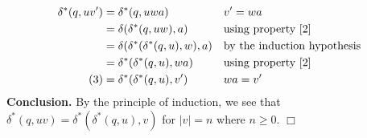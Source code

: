 \documentclass [10pt]{article}
\begin{document}
\begin{enumerate}
\begin{align}
	\delta^{*}(q,uv') &= \delta^{*}(q,uwa) && \text{$v' = wa$} \nonumber \\
	&= \delta(\delta^{*}(q,uw),a) && \text{using property \ref{2}} \nonumber \\
	&= \delta(\delta^{*}(\delta^{*}(q,u),w),a) && \text{by the induction hypothesis} \nonumber \\
	&= \delta^{*}(\delta^{*}(q,u),wa) && \text{using property \ref{2}} \nonumber \\
	\label{3} \tag{3} &= \delta^{*}(\delta^{*}(q,u),v') && \text{$wa = v'$}
	\end{align}
	\textbf{Conclusion.} By the principle of induction, we see that $\delta^{*}(q,uv) = \delta^{*}(\delta^{*}(q,u),v)$ for $\left| v \right| = n$ where $n \ge 0$. $\Box$
\end{enumerate}
\end{document}
